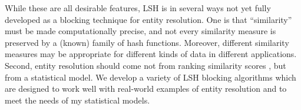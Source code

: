 \documentclass[11pt]{article}
\begin{document}
While these are all desirable features, LSH is in several ways not yet fully
developed as a blocking technique for entity resolution.  One is that
``similarity'' must be made computationally precise, and not every similarity
measure is preserved by a (known) family of hash functions.  Moreover,
different similarity measures may be appropriate for different kinds of data
in different applications.  Second, entity resolution should come not from
ranking similarity scores \citep[as in][]{christen_2014}, but from a
statistical model. We develop a variety of LSH blocking algorithms which are
designed to work well with real-world examples of entity resolution and to
meet the needs of my statistical models.

%
%
%
\end{document}
